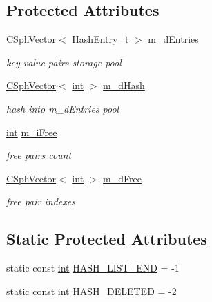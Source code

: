 \subsection*{Protected Attributes}
\begin{DoxyCompactItemize}
\item 
\hyperlink{classCSphVector}{C\-Sph\-Vector}$<$ \hyperlink{structCSphFixedHash_1_1HashEntry__t}{Hash\-Entry\-\_\-t} $>$ \hyperlink{classCSphFixedHash_aba1dc52d241597da01057190430e12a5}{m\-\_\-d\-Entries}
\begin{DoxyCompactList}\small\item\em key-\/value pairs storage pool \end{DoxyCompactList}\item 
\hyperlink{classCSphVector}{C\-Sph\-Vector}$<$ \hyperlink{sphinxexpr_8cpp_a4a26e8f9cb8b736e0c4cbf4d16de985e}{int} $>$ \hyperlink{classCSphFixedHash_abda07cbb047e51558be3f0b34826f72e}{m\-\_\-d\-Hash}
\begin{DoxyCompactList}\small\item\em hash into m\-\_\-d\-Entries pool \end{DoxyCompactList}\item 
\hyperlink{sphinxexpr_8cpp_a4a26e8f9cb8b736e0c4cbf4d16de985e}{int} \hyperlink{classCSphFixedHash_a3c34e89a7a12eb42ad09728e3de09851}{m\-\_\-i\-Free}
\begin{DoxyCompactList}\small\item\em free pairs count \end{DoxyCompactList}\item 
\hyperlink{classCSphVector}{C\-Sph\-Vector}$<$ \hyperlink{sphinxexpr_8cpp_a4a26e8f9cb8b736e0c4cbf4d16de985e}{int} $>$ \hyperlink{classCSphFixedHash_aa2d34730efe0f159b46fce97f473a4ba}{m\-\_\-d\-Free}
\begin{DoxyCompactList}\small\item\em free pair indexes \end{DoxyCompactList}\end{DoxyCompactItemize}
\subsection*{Static Protected Attributes}
\begin{DoxyCompactItemize}
\item 
static const \hyperlink{sphinxexpr_8cpp_a4a26e8f9cb8b736e0c4cbf4d16de985e}{int} \hyperlink{classCSphFixedHash_aa158f9c67eeeb94db05bf09125ba677d}{H\-A\-S\-H\-\_\-\-L\-I\-S\-T\-\_\-\-E\-N\-D} = -\/1
\item 
static const \hyperlink{sphinxexpr_8cpp_a4a26e8f9cb8b736e0c4cbf4d16de985e}{int} \hyperlink{classCSphFixedHash_ae2fa3ad3688e80830a3d38edf8049d61}{H\-A\-S\-H\-\_\-\-D\-E\-L\-E\-T\-E\-D} = -\/2
\end{DoxyCompactItemize}
